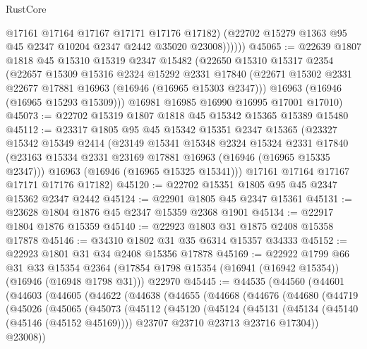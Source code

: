 \begin{lexlean}{RustCore}
\begin{coremodule}
                @17161
                @17164
                @17167
                @17171
                @17176
                @17182)
              (@22702 @15279 @1363 @95 @45 @2347 @10204 @2347 @2442 @35020 @23008))))))
@45065 := @22639
    @1807
    @1818
    @45
    @15310
    @15319
    @2347
    @15482
    (@22650
      @15310
      @15317
      @2354
      (@22657
        @15309
        @15316
        @2324
        @15292
        @2331
        @17840
        (@22671 @15302 @2331 @22677 @17881 @16963 (@16946 (@16965 @15303 @2347)))
        @16963
        (@16946 (@16965 @15293 @15309)))
      @16981
      @16985
      @16990
      @16995
      @17001
      @17010)
@45073 := @22702 @15319 @1807 @1818 @45 @15342 @15365 @15389 @15480
@45112 := @23317
    @1805
    @95
    @45
    @15342
    @15351
    @2347
    @15365
    (@23327
      @15342
      @15349
      @2414
      (@23149
        @15341
        @15348
        @2324
        @15324
        @2331
        @17840
        (@23163 @15334 @2331 @23169 @17881 @16963 (@16946 (@16965 @15335 @2347)))
        @16963
        (@16946 (@16965 @15325 @15341)))
      @17161
      @17164
      @17167
      @17171
      @17176
      @17182)
@45120 := @22702 @15351 @1805 @95 @45 @2347 @15362 @2347 @2442
@45124 := @22901 @1805 @45 @2347 @15361
@45131 := @23628 @1804 @1876 @45 @2347 @15359 @2368 @1901
@45134 := @22917 @1804 @1876 @15359
@45140 := @22923 @1803 @31 @1875 @2408 @15358 @17878
@45146 := @34310 @1802 @31 @35 @6314 @15357 @34333
@45152 := @22923 @1801 @31 @34 @2408 @15356 @17878
@45169 := @22922
    @1799
    @66
    @31
    @33
    @15354
    @2364
    (@17854 @1798 @15354 (@16941 (@16942 @15354)) (@16946 (@16948 @1798 @31)))
    @22970
@45445 := @44535
    (@44560
      (@44601
        (@44603
          (@44605
            (@44622
              (@44638
                (@44655
                  (@44668
                    (@44676
                      (@44680
                        (@44719
                          (@45026
                            (@45065
                              (@45073
                                (@45112
                                  (@45120
                                    (@45124
                                      (@45131
                                        (@45134 (@45140 (@45146 (@45152 @45169))))
                                        @23707
                                        @23710
                                        @23713
                                        @23716
                                        @17304))
                                    @23008))

\end{coremodule}
\end{lexlean}
